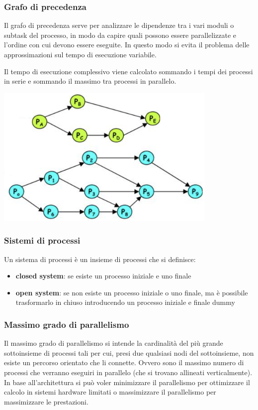 \documentclass[a4paper]{article}
\begin{document}
\subsubsection*{Grafo di precedenza}
\begin{center}
	\begin{minipage}{0.59\textwidth}
		Il grafo di precedenza serve per analizzare le dipendenze tra i vari moduli o subtask del processo, in modo da capire quali
		possono essere parallelizzate e l'ordine con cui devono essere eseguite. In questo modo si evita il problema delle
		approssimazioni sul tempo di esecuzione variabile.
		
		Il tempo di esecuzione complessivo viene calcolato sommando i tempi dei processi in serie e sommando il massimo tra
		processi in parallelo.
	\end{minipage}
	\begin{minipage}{0.4\textwidth}
		\centering
		\includegraphics[width=0.8\textwidth]{diagramma precedenze.png}
	\end{minipage}
\end{center}

\subsubsection*{Sistemi di processi}
Un sistema di processi è un insieme di processi che si definisce:
\begin{itemize}
	\item \textbf{closed system}: se esiste un processo iniziale e uno finale
	\item \textbf{open system}: se non esiste un processo iniziale o uno finale, ma è possibile trasformarlo in chiuso
	introducendo  un processo iniziale e finale dummy
\end{itemize}

\subsubsection*{Massimo grado di parallelismo}
Il massimo grado di parallelismo si intende la cardinalità del più grande sottoinsieme di processi tali per cui, presi due
qualsiasi nodi del sottoinsieme, non esiste un percorso orientato che li connette. Ovvero sono il massimo numero di processi
che verranno eseguiri in parallelo (che si trovano allineati verticalmente). In base all'architettura si può voler  minimizzare
il parallelismo per ottimizzare il calcolo in sistemi hardware limitati o massimizzare il parallelismo per massimizzare le
prestazioni.
\end{document}
